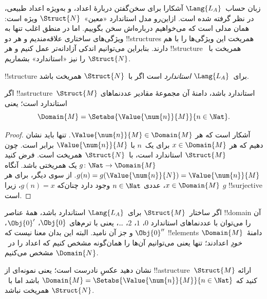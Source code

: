 \documentclass[../../../include/open-logic-section]{subfiles}
\begin{document}

زبان حساب~$\Lang{L_A}$ آشکارا برای سخن‌گفتن دربارهٔ اعداد، و به‌ویژه
اعداد طبیعی، در نظر گرفته شده است. ازاین‌رو مدل استاندارد
«معین»~$\Struct{N}$ ویژه است: همان مدلی است که می‌خواهیم درباره‌اش
سخن بگوییم. اما در منطق اغلب تنها به ویژگی‌های ساختاری علاقه‌مندیم و
هر دو !!{structure}s همریخت این ویژگی‌ها را با هم دارند. بنابراین
می‌توانیم اندکی آزادانه‌تر عمل کنیم و هر !!{structure} همریخت
با~$\Struct{N}$ را نیز «استاندارد» بشماریم.

\begin{defn}
!!{structure} برای~$\Lang{L_A}$
\emph{استاندارد} است اگر با~$\Struct{N}$ همریخت باشد.
\end{defn}

\begin{prop}
 اگر !!a{structure}~$\Struct{M}$
استاندارد باشد، دامنهٔ آن مجموعهٔ مقادیر عددنماهای استاندارد است؛ یعنی
\[
\Domain{M} = \Setabs{\Value{\num{n}}{M}}{n \in \Nat}.
\]
\end{prop}

\begin{proof}
آشکار است که هر $\Value{\num{n}}{M} \in \Domain{M}$. تنها باید نشان
دهیم که هر $x \in \Domain{M}$ برای یک~$n$ با
$\Value{\num{n}}{M}$ برابر است. چون $\Struct{M}$ استاندارد است،
با~$\Struct{N}$ همریخت است. فرض کنید
$g\colon \Nat \to \Domain{M}$ یک همریختی باشد. آنگاه
$g(n) = g(\Value{\num{n}}{N}) = \Value{\num{n}}{M}$. از سوی دیگر،
برای هر $x \in \Domain{M}$، عددی $n \in \Nat$ وجود دارد چنان‌که
$g(n) = x$، زیرا $g$ !!{surjective} است.
\end{proof}

\begin{explain}
اگر ساختار~$\Struct{M}$ برای~$\Lang{L_A}$ استاندارد باشد،
همهٔ عناصر !!{domain} آن را می‌توان با عددنماهای استاندارد
$\num{0}$، $\num{1}$، $\num{2}$، \dots، یعنی با ترم‌های
$\Obj{0}$، $\Obj{0}'$، $\Obj{0}''$ و جز آن نامید. البته این بدان معنا
نیست که !!{element}s دامنهٔ~$\Domain{M}$
\emph{خودِ} اعدادند؛ تنها یعنی می‌توانیم آن‌ها را همان‌گونه مشخص کنیم
که اعداد را در~$\Domain{N}$ مشخص می‌کنیم.
\end{explain}

\begin{prob}
نشان دهید عکسِ
 نادرست است؛ یعنی نمونه‌ای
از !!a{structure}~$\Struct{M}$ ارائه کنید که
$\Domain{M} = \Setabs{\Value{\num{n}}{M}}{n \in \Nat}$ باشد اما
با~$\Struct{N}$ همریخت نباشد.
\end{prob}
\end{document}
